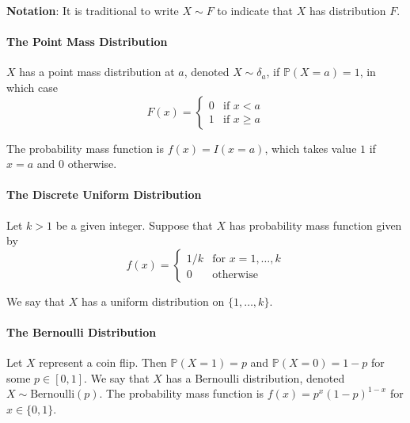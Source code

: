 \textbf{Notation}: It is traditional to write \(X \sim F\) to indicate that \(X\) has distribution \(F\). 


\paragraph{The Point Mass Distribution}\label{the-point-mass-distribution}

\(X\) has a point mass distribution at \(a\), denoted \(X \sim \delta_a\), if \(\mathbb{P}(X = a) = 1\), in which case
\[
F(x) = 
\begin{cases}
0 &\text{if } x < a 
\\[1ex]
1 &\text{if } x \geq a
\end{cases}
\]

The probability mass function is \(f(x) = I(x = a)\), which takes value $1$ if \(x = a\) and 0 otherwise.

\paragraph{The Discrete Uniform Distribution}\label{the-discrete-uniform-distribution}

Let \(k > 1\) be a given integer. Suppose that \(X\) has probability mass function given by
\[
f(x) = 
\begin{cases}
1/k &\text{for } x = 1, \dots, k 
\\[1ex]
0 &\text{otherwise}
\end{cases}
\]

We say that \(X\) has a uniform distribution on \(\{ 1, \dots, k \}\).

\paragraph{The Bernoulli Distribution}\label{the-bernoulli-distribution}

Let \(X\) represent a coin flip. Then \(\mathbb{P}(X = 1) = p\) and \(\mathbb{P}(X = 0) = 1 - p\) for some \(p \in [0, 1]\). We say that \(X\) has a Bernoulli distribution, denoted \(X \sim \text{Bernoulli}(p)\). The probability mass function is \(f(x) = p^x (1 - p)^{1 - x}\) for \(x \in \{ 0, 1 \}\).


